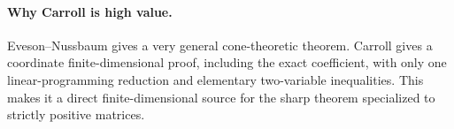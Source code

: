 \paragraph{Why Carroll is high value.}
Eveson--Nussbaum gives a very general cone-theoretic theorem.  Carroll gives a
coordinate finite-dimensional proof, including the exact coefficient, with only one
linear-programming reduction and elementary two-variable inequalities.  This makes it
a direct finite-dimensional source for the sharp theorem specialized to strictly positive matrices.



